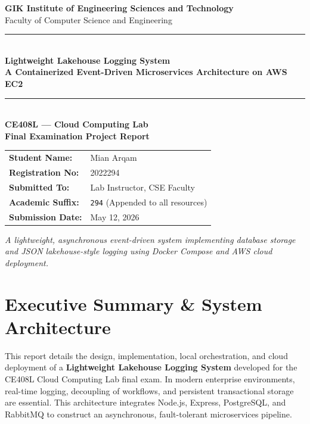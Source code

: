 \documentclass[11pt,a4paper]{article}
\begin{document}
\begin{titlepage}
  \centering
  \vspace*{2cm}
  
  {\Large\bfseries GIK Institute of Engineering Sciences and Technology}\\[0.5cm]
  {\large Faculty of Computer Science and Engineering}\\[1.5cm]
  
  \rule{\linewidth}{2pt}\\[0.5cm]
  {\huge\bfseries Lightweight Lakehouse Logging System}\\[0.4cm]
  {\large\bfseries A Containerized Event-Driven Microservices Architecture on AWS EC2}\\[0.2cm]
  \rule{\linewidth}{2pt}\\[1.5cm]
  
  {\Large\bfseries CE408L --- Cloud Computing Lab}\\[0.3cm]
  {\large\bfseries Final Examination Project Report}\\[2cm]
  
  \begin{tabular}{ll}
    \textbf{Student Name:} & Mian Arqam \\
    \textbf{Registration No:} & 2022294 \\
    \textbf{Submitted To:} & Lab Instructor, CSE Faculty \\
    \textbf{Academic Suffix:} & \texttt{294} (Appended to all resources) \\
    \textbf{Submission Date:} & May 12, 2026 \\
  \end{tabular}
  
  \vfill
  \textit{A lightweight, asynchronous event-driven system implementing database storage and JSON lakehouse-style logging using Docker Compose and AWS cloud deployment.}
\end{titlepage}

\newpage

\section{Executive Summary \& System Architecture}
This report details the design, implementation, local orchestration, and cloud deployment of a \textbf{Lightweight Lakehouse Logging System} developed for the CE408L Cloud Computing Lab final exam. In modern enterprise environments, real-time logging, decoupling of workflows, and persistent transactional storage are essential. This architecture integrates Node.js, Express, PostgreSQL, and RabbitMQ to construct an asynchronous, fault-tolerant microservices pipeline.
\end{document}
